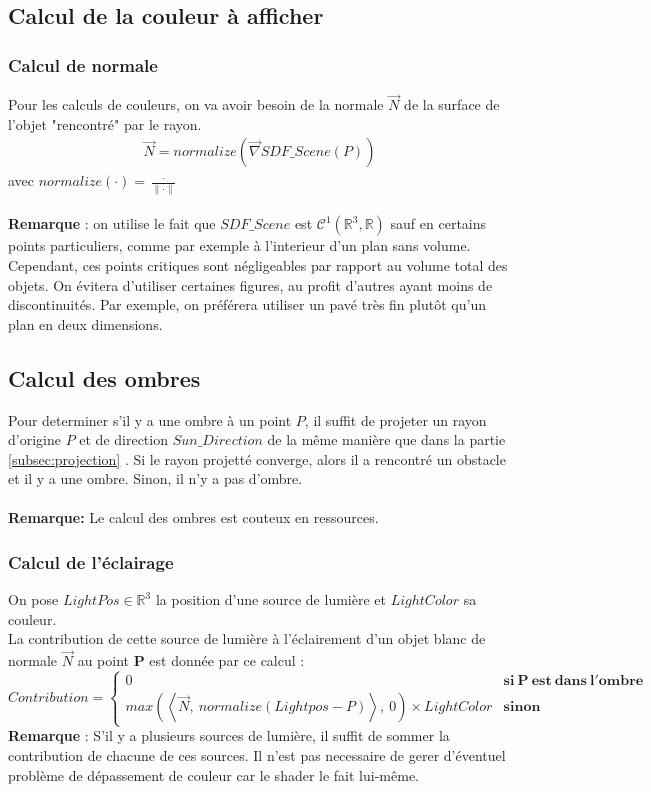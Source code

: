 \newpage
\subsection{Calcul de la couleur à afficher}
\subsubsection{Calcul de normale}
Pour les calculs de couleurs, on va avoir besoin de la normale $\Vec{N}$ de la surface de l'objet "rencontré" par le rayon.
\begin{align*}
    \Vec{N}=normalize(\Vec{\nabla}SDF\_Scene(P))
\end{align*}
avec $normalize(\cdot )=\frac{\cdot }{\|\cdot \|}$\\
\\
\textbf{Remarque} : on utilise le fait que $SDF\_Scene$ est $\mathcal{C}^1(\mathbb{R}^3,\mathbb{R})$ sauf en certains points particuliers, comme par exemple à l'interieur d'un plan sans volume. Cependant, ces points critiques sont négligeables par rapport au volume total des objets. On évitera d'utiliser certaines figures, au profit d'autres ayant moins de discontinuités. Par exemple, on préférera utiliser un pavé très fin plutôt qu'un plan en deux dimensions.

\subsection{Calcul des ombres}
Pour determiner s'il y a une ombre à un point $P$, il suffit de projeter un rayon d'origine $P$ et de direction $Sun\_Direction$ de la même manière que dans la partie \ref{subsec:projection} . Si le rayon projetté converge, alors il a rencontré un obstacle et il y a une ombre. Sinon, il n'y a pas d'ombre.\\
\\\textbf{Remarque:} Le calcul des ombres est couteux en ressources.

\subsubsection{Calcul de l'éclairage}
On pose $LightPos \in \mathbb{R}^3$ la position d'une source de lumière et $LightColor$ sa couleur.
\\La contribution de cette source de lumière à l'éclairement d'un objet blanc de normale $\Vec{N}$ au point $\mathbf{P}$ est donnée par ce calcul :
$$
    Contribution=\left\{
        \begin{array}{ll}
            0 & \mathbf{si\ P\ est\ dans\ l'ombre} \\
            max(\left\langle \Vec{N},\ normalize(Lightpos-P) \right\rangle,\ 0) \times LightColor & \mathbf{sinon}
        \end{array}
    \right.
$$
\textbf{Remarque} : S'il y a plusieurs sources de lumière, il suffit de sommer la contribution de chacune de ces sources. Il n'est pas necessaire de gerer d'éventuel problème de dépassement de couleur car le shader le fait lui-même.

